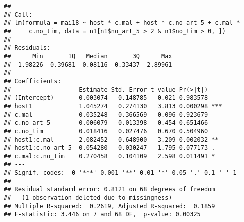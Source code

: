 \documentclass[]{article}
\begin{document}
\begin{verbatim}
## 
## Call:
## lm(formula = mai18 ~ host * c.mal + host * c.no_art_5 + c.mal * 
##     c.no_tim, data = n1[n1$no_art_5 > 2 & n1$no_tim > 0, ])
## 
## Residuals:
##      Min       1Q   Median       3Q      Max 
## -1.98226 -0.39681 -0.08116  0.33437  2.89961 
## 
## Coefficients:
##                   Estimate Std. Error t value Pr(>|t|)    
## (Intercept)      -0.003074   0.148785  -0.021 0.983578    
## host1             1.045274   0.274130   3.813 0.000298 ***
## c.mal             0.035248   0.366569   0.096 0.923679    
## c.no_art_5       -0.006079   0.013398  -0.454 0.651466    
## c.no_tim          0.018416   0.027476   0.670 0.504960    
## host1:c.mal       2.082452   0.648900   3.209 0.002032 ** 
## host1:c.no_art_5 -0.054280   0.030247  -1.795 0.077173 .  
## c.mal:c.no_tim    0.270458   0.104109   2.598 0.011491 *  
## ---
## Signif. codes:  0 '***' 0.001 '**' 0.01 '*' 0.05 '.' 0.1 ' ' 1
## 
## Residual standard error: 0.8121 on 68 degrees of freedom
##   (1 observation deleted due to missingness)
## Multiple R-squared:  0.2619, Adjusted R-squared:  0.1859 
## F-statistic: 3.446 on 7 and 68 DF,  p-value: 0.00325
\end{verbatim}
\end{document}
